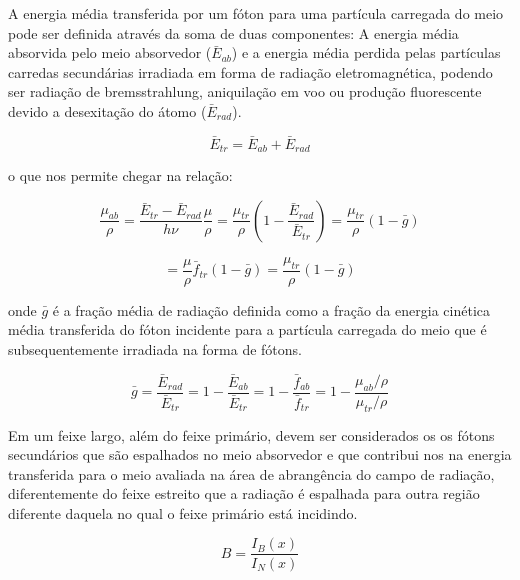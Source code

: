 \documentclass[11pt,a4paper]{article}
\begin{document}
    A energia média transferida por um fóton para uma partícula carregada do meio pode ser definida através da soma de duas componentes: A energia média absorvida pelo meio absorvedor ($\bar{E}_{ab}$) e a energia média perdida pelas partículas carredas secundárias irradiada em forma de radiação eletromagnética, podendo ser radiação de bremsstrahlung, aniquilação em voo ou produção fluorescente devido a desexitação do átomo ($\bar{E}_{rad}$).
            
                \begin{equation}
                    \bar{E}_{tr} = \bar{E}_{ab} + \bar{E}_{rad}
                \end{equation}

    \noindent o que nos permite chegar na relação:

                $$\frac{\mu_{ab}}{\rho} = \frac{\bar{E}_{tr} - \bar{E}_{rad}}{h \nu} \frac{\mu}{\rho} = \frac{\mu_{tr}}{\rho} \left(1 - \frac{\bar{E}_{rad}}{\bar{E}_{tr}}\right) = \frac{\mu_{tr}}{\rho} (1 - \bar{g}) $$

                \begin{equation}
                    = \frac{\mu}{\rho}\bar{f}_{tr}(1 - \bar{g}) = \frac{\mu_{tr}}{\rho}(1 - \bar{g})
                \end{equation}

    \noindent onde $\bar{g}$ é a fração média de radiação definida como a fração da energia cinética média transferida do fóton incidente para a partícula carregada do meio que é subsequentemente irradiada na forma de fótons.

                \begin{equation}
                    \bar{g} = \frac{\bar{E}_{rad}}{\bar{E}_{tr}} 
                    = 1 - \frac{\bar{E}_{ab}}{\bar{E}_{tr}}
                    = 1 - \frac{\bar{f}_{ab}}{\bar{f}_{tr}}
                    = 1 - \frac{\mu_{ab}/ \rho}{\mu_{tr}/ \rho}
                \end{equation}

                
    Em um feixe largo, além do feixe primário, devem ser considerados os os fótons secundários que são espalhados no meio absorvedor e que contribui nos na energia transferida para o meio avaliada na área de abrangência do campo de radiação, diferentemente do feixe estreito que a radiação é espalhada para outra região diferente daquela no qual o feixe primário está incidindo. 

                \begin{equation}
                    B = \frac{I_B(x)}{I_N(x)} 
                \end{equation}
\end{document}
